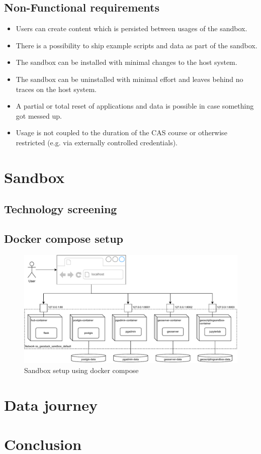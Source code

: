 \documentclass[11pt, a4paper, oneside, parskip=full-]{scrartcl}
\begin{document}
\subsection{Non-Functional requirements}
\begin{itemize}
  \item Users can create content which is persisted between usages of the
  sandbox.
  \item There is a possibility to ship example scripts and data as part of the
  sandbox.
  \item The sandbox can be installed with minimal changes to the host system.
  \item The sandbox can be uninstalled with minimal effort and leaves behind no
  traces on the host system.
  \item A partial or total reset of applications and data is possible in case
  something got messed up.
  \item Usage is not coupled to the duration of the CAS course or otherwise
  restricted (e.g. via externally controlled credentials).
\end{itemize}

\section{Sandbox}
\subsection{Technology screening}
\subsection{Docker compose setup}
\begin{figure}[H]
  \centering
  \includegraphics[width=1\textwidth]{compose_setup}
  \caption{Sandbox setup using docker compose}
  \label{fig:sandboxsetup}
\end{figure}

\section{Data journey}

\section{Conclusion}
\end{document}

